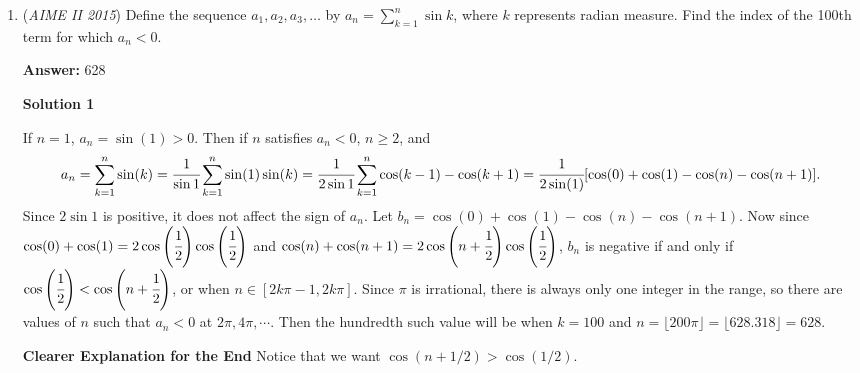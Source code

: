 \begin{enumerate}
For $n=10,$ we have\begin{align*}[x^0] \frac{(1-x^3)^{10}}{(1-x)^{10}} &= [x^0] (1-x)^{-10} \\&= 1\cdot\binom{9}{9} \\&= 1\cdot1 \\&= \underline{1}.\end{align*}
Hence, the answer is\begin{align*}2\sum_{n=4}^{10} [x^{10-n}]  \frac{(1-x^3)^n}{(1-x)^n} &= 2(10+51+90+77+36+9+1) \\&= 2\cdot274 \\&= \boxed{548}.\end{align*}


 -lpieleanu

 \textbf{Remark} 2015 AMC 12A \#22 is a harder version of this problem.

 


	\item (\textit{AIME II 2015}) Define the sequence $a_1, a_2, a_3, \ldots$ by $a_n = \sum\limits_{k=1}^n \sin{k}$, where $k$ represents radian measure. Find the index of the 100th term for which $a_n < 0$.


 
 \textbf{Answer: }628



\textbf{Solution 1}

If $n = 1$, $a_n = \sin(1) > 0$.  Then if $n$ satisfies $a_n < 0$, $n \ge 2$, and
 \[a_n = \sum_{k=1}^n \sin(k) = \cfrac{1}{\sin{1}} \sum_{k=1}^n\sin(1)\sin(k) = \cfrac{1}{2\sin{1}} \sum_{k=1}^n\cos(k - 1) - \cos(k + 1) = \cfrac{1}{2\sin(1)} [\cos(0) + \cos(1) - \cos(n) - \cos(n + 1)].\]Since $2\sin 1$ is positive, it does not affect the sign of $a_n$.  Let $b_n = \cos(0) + \cos(1) - \cos(n) - \cos(n + 1)$.  Now since $\cos(0) + \cos(1) = 2\cos\left(\cfrac{1}{2}\right)\cos\left(\cfrac{1}{2}\right)$ and $\cos(n) + \cos(n + 1) = 2\cos\left(n + \cfrac{1}{2}\right)\cos\left(\cfrac{1}{2}\right)$, $b_n$ is negative if and only if $\cos\left(\cfrac{1}{2}\right) < \cos\left(n + \cfrac{1}{2}\right)$, or when $n \in [2k\pi - 1, 2k\pi]$.  Since $\pi$ is irrational, there is always only one integer in the range, so there are values of $n$ such that $a_n < 0$ at $2\pi, 4\pi, \cdots$.  Then the hundredth such value will be when $k = 100$ and $n = \lfloor 200\pi \rfloor = \lfloor 628.318 \rfloor = \boxed{628}$.

 \textbf{Clearer Explanation for the End} Notice that we want $\cos(n+1/2)>\cos(1/2).$


\end{enumerate}
